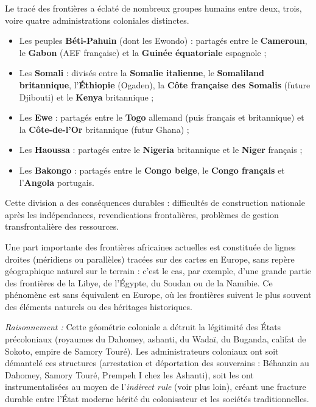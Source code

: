 \documentclass[11pt]{article}
\begin{document}
\begin{exemplebox}
Le tracé des frontières a éclaté de nombreux groupes humains entre deux, trois, voire quatre administrations coloniales distinctes.
\begin{itemize}
\item Les peuples \textbf{Béti-Pahuin} (dont les Ewondo) : partagés entre le \textbf{Cameroun}, le \textbf{Gabon} (AEF française) et la \textbf{Guinée équatoriale} espagnole ;
\item Les \textbf{Somali} : divisés entre la \textbf{Somalie italienne}, le \textbf{Somaliland britannique}, l'\textbf{Éthiopie} (Ogaden), la \textbf{Côte française des Somalis} (future Djibouti) et le \textbf{Kenya} britannique ;
\item Les \textbf{Ewe} : partagés entre le \textbf{Togo} allemand (puis français et britannique) et la \textbf{Côte-de-l'Or} britannique (futur Ghana) ;
\item Les \textbf{Haoussa} : partagés entre le \textbf{Nigeria} britannique et le \textbf{Niger} français ;
\item Les \textbf{Bakongo} : partagés entre le \textbf{Congo belge}, le \textbf{Congo français} et l'\textbf{Angola} portugais.
\end{itemize}
Cette division a des conséquences durables : difficultés de construction nationale après les indépendances, revendications frontalières, problèmes de gestion transfrontalière des ressources.
\end{exemplebox}

\begin{savaistu}
Une part importante des frontières africaines actuelles est constituée de lignes droites (méridiens ou parallèles) tracées sur des cartes en Europe, sans repère géographique naturel sur le terrain : c'est le cas, par exemple, d'une grande partie des frontières de la Libye, de l'Égypte, du Soudan ou de la Namibie. Ce phénomène est sans équivalent en Europe, où les frontières suivent le plus souvent des éléments naturels ou des héritages historiques.
\end{savaistu}

\emph{Raisonnement :} Cette géométrie coloniale a détruit la légitimité des États précoloniaux (royaumes du Dahomey, ashanti, du Wadaï, du Buganda, califat de Sokoto, empire de Samory Touré). Les administrateurs coloniaux ont soit démantelé ces structures (arrestation et déportation des souverains : Béhanzin au Dahomey, Samory Touré, Prempeh I\ier{} chez les Ashanti), soit les ont instrumentalisées au moyen de l'\emph{indirect rule} (voir plus loin), créant une fracture durable entre l'État moderne hérité du colonisateur et les sociétés traditionnelles.
\end{document}
